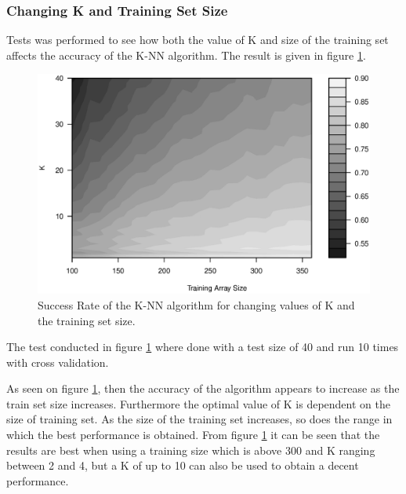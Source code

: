 \subsubsection{Changing K and Training Set Size}
Tests was performed to see how both the value of K and size of the training set affects the accuracy of the K-NN algorithm. 
The result is given in figure \ref{fig:personDependent_contour}.


\begin{figure}[H]
\centering
\includegraphics[width = \textwidth]{graphics/graph_G3M2_10_10}
\caption{Success Rate of the K-NN algorithm for changing values of K and the training set size.}
\label{fig:personDependent_contour}
\end{figure}


The test conducted in figure \ref{fig:personDependent_contour} where done with a test size of 40 and run 10 times with cross validation.

As seen on figure \ref{fig:personDependent_contour}, then the accuracy of the algorithm appears to increase as the train set size increases.
Furthermore the optimal value of K is dependent on the size of training set. 
As the size of the training set increases, so does the range in which the best performance is obtained.
From figure \ref{fig:personDependent_contour} it can be seen that the results are best when using a training size which is above 300 and K ranging between 2 and 4, but a K of up to 10 can also be used to obtain a decent performance.


